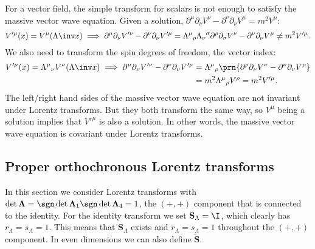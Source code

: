 \documentclass[11pt]{article}
\renewcommand{\S}{\mathbf{S}}
\newcommand{\St}{\widetilde{\S}}
\newcommand{\Lambdab}{\boldsymbol{\Lambda}}
\begin{document}
For a vector field, the simple transform for scalars is not enough to satisfy the massive vector wave equation.
Given a solution, \(\partial^\mu \partial_\nu V^\nu - \partial^\nu \partial_\nu V^\mu = m^2 V^\mu\):
%
\begin{equation*}
  V'^\mu(x) = V^\mu(\Lambda\inv x)
  \implies
  \partial^\mu \partial_\nu V'^\nu - \partial^\nu \partial_\nu V'^\mu 
    = \Lambda^\mu{}_\rho \Lambda_\nu{}^\sigma \partial^\rho \partial_\sigma V^\nu
      - \partial^\nu \partial_\nu V^\mu 
    \neq m^2 V'^\mu.
\end{equation*}
%
We also need to transform the spin degrees of freedom, the vector index:
%
\begin{equation}\label{eq:vectorcovt}
\begin{aligned}
  V'^\mu(x) = \Lambda^\mu{}_\nu V^\nu(\Lambda\inv x)
  \implies
  \partial^\mu \partial_\nu V'^\nu - \partial^\nu \partial_\nu V'^\mu 
    &= \Lambda^\mu{}_\rho \prn{\partial^\rho \partial_\nu V^\nu
      - \partial^\nu \partial_\nu V^\rho} \\
    &= m^2 \Lambda^\mu{}_\rho  V^\rho
    = m^2 V'^\mu.
\end{aligned}
\end{equation}
%
The left/right hand sides of the massive vector wave equation are not invariant under Lorentz transforms.
But they both transform the same way, so \(V^\mu\) being a solution implies that \(V'^\mu\) is also a solution.
In other words, the massive vector wave equation is covariant under Lorentz transforms.


\subsection{Proper orthochronous Lorentz transforms}\label{sec:properlorentz}

In this section we consider Lorentz transforms with \(\det \Lambdab = \sgn \det \Lambdab_1 \sgn \det \Lambdab_4 = 1\), \ie the \((+,+)\) component that is connected to the identity.
For the identity transform we set \(\S_\Lambda = \I\), which clearly has \(r_\Lambda = s_\Lambda = 1\).
This means that \(\S_\Lambda\) exists and \(r_\Lambda = s_\Lambda = 1\) throughout the \((+,+)\) component.
In even dimensions we can also define \(\St\).
\end{document}
